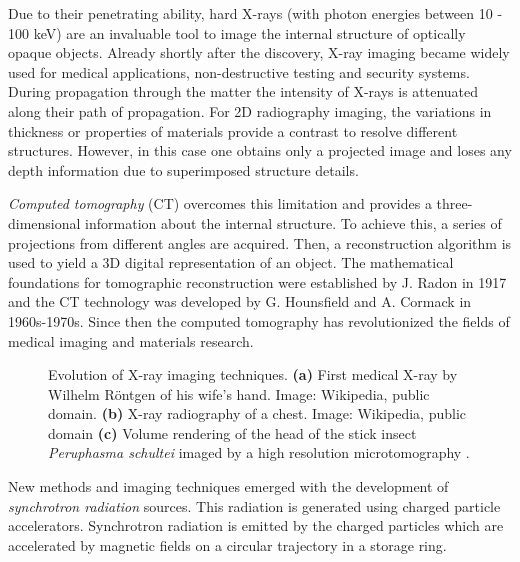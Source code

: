 Due to their penetrating ability, hard X-rays (with photon energies between 10 - 100 keV) are an invaluable tool to image the internal structure of optically opaque objects. Already shortly after the discovery, X-ray imaging became widely used for medical applications, non-destructive testing and security systems. During propagation through the matter the intensity of X-rays is attenuated along their path of propagation. For 2D radiography imaging, the variations in thickness or properties of materials provide a contrast to resolve  different  structures. However, in this case one obtains only a projected image and loses any depth information due to superimposed structure details.

\textit{Computed tomography} (CT) overcomes this limitation and provides a three-dimensional information about the internal structure. To achieve this, a series of projections from different angles are acquired. Then, a reconstruction algorithm is used to yield a 3D digital representation of an object.  The mathematical foundations  for tomographic reconstruction were established by J. Radon in 1917 \cite{Radon17} and the CT technology was developed by G. Hounsfield and A. Cormack in 1960s-1970s.  Since then the computed tomography has revolutionized the fields of medical imaging and materials research.

\begin{figure}[t]
  \centerline{
    \mbox{}
    \mbox{}
    \mbox{}
  }
  \caption[]{Evolution of X-ray imaging techniques. \textbf{(a)} First medical X-ray by Wilhelm R\"ontgen of his wife's hand. Image: Wikipedia, public domain. \textbf{(b)} X-ray radiography of a chest. Image: Wikipedia, public domain   \textbf{(c)} Volume rendering of the head of the stick insect \textit{Peruphasma schultei} imaged by a high resolution microtomography  \cite{vandeKamp13}.}
  \label{fig:xray_examples}
\end{figure}

New methods and imaging techniques emerged with the development of \textit{synchrotron radiation}
sources. This radiation is generated using charged particle
accelerators.  Synchrotron radiation is emitted by the charged particles which are accelerated by magnetic fields on a circular trajectory in a storage ring. 

